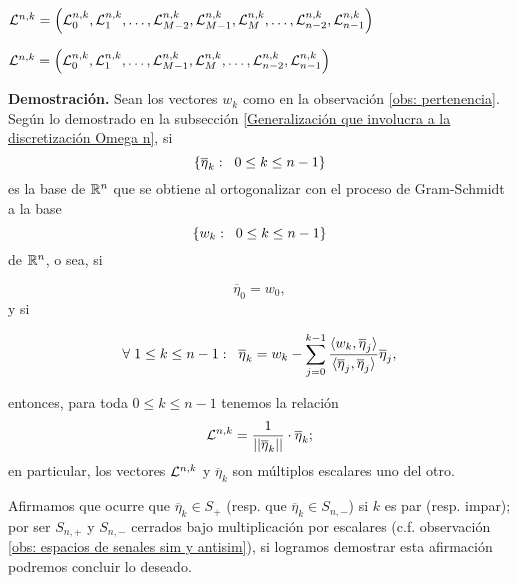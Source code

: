 {\huge{$\mathcal{L}^{n,k} = 
\left(
\mathcal{L}^{n,k}_{0} , \mathcal{L}^{n,k}_{1}, \ldots ,
\mathcal{L}^{n,k}_{M-2}, \mathcal{L}^{n,k}_{M-1}, \mathcal{L}^{n,k}_{M},
\ldots , \mathcal{L}^{n,k}_{n-2}, \mathcal{L}^{n,k}_{n-1}
\right)
$}}

\vspace{2cm}

{\huge{$\mathcal{L}^{n,k} = 
\left(
\mathcal{L}^{n,k}_{0} , \mathcal{L}^{n,k}_{1}, \ldots ,
\mathcal{L}^{n,k}_{M-1}, \mathcal{L}^{n,k}_{M},
\ldots , \mathcal{L}^{n,k}_{n-2}, \mathcal{L}^{n,k}_{n-1}
\right)
$}}




\noindent
\textbf{Demostración.}
Sean los vectores $w_{k}$ como en la observación 
\ref{obs: pertenencia}.
Según lo demostrado en la subsección 
\ref{Generalización que involucra a la discretización Omega n}, si
\[
\{ \overline{\eta}_{k} : \hspace{0.2cm} 0 \leq k \leq n-1 \}
\]
es la base de $\mathbb{R}^{n}$ que se obtiene al ortogonalizar 
con el proceso de Gram-Schmidt a la base
\[
\{ w_{k} : \hspace{0.2cm} 0 \leq k \leq n-1 \}
\]
de $\mathbb{R}^{n}$,
o sea, si 

\begin{equation}
\label{eq3: 19En}
\overline{\eta}_{0}= w_{0},
\end{equation}
y si

\begin{equation}
\label{eq4: 19En}
\forall \hspace{0.1cm} 1 \leq k \leq n-1: 
\hspace{0.2cm}
\overline{\eta}_{k}= w_{k}-
\suma{j=0}{k-1}{
\frac{\langle w_{k}, \overline{\eta}_{j} \rangle}
{\langle \overline{\eta}_{j}, \overline{\eta}_{j} \rangle}\overline{\eta}_{j},
}
\end{equation}


\noindent
entonces, para toda $0 \leq k \leq n-1$ tenemos la relación 
\[
\mathcal{L}^{n,k}= \frac{1}{||\overline{\eta}_{k}||} \cdot \overline{\eta}_{k};
\]
en particular, los vectores $\mathcal{L}^{n,k}$ y 
$\overline{\eta}_{k}$ son múltiplos escalares uno del otro.

Afirmamos que ocurre que
$\overline{\eta}_{k} \in S_{+}$ (resp. que
$\overline{\eta}_{k} \in S_{n,-}$) si $k$ es par
(resp. impar); por ser $S_{n,+}$
y $S_{n,-}$ cerrados bajo multiplicación
por escalares (c.f. observación 
\ref{obs: espacios de senales sim y antisim}),
si logramos demostrar esta afirmación podremos concluir lo deseado.



